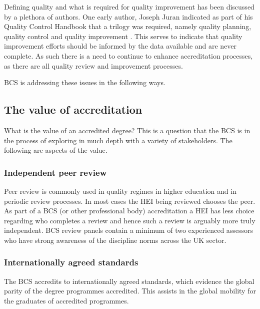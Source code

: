 \documentclass[sigconf]{acmart}
\begin{document}
Defining quality and what is required for quality improvement has been discussed by a plethora of authors. One early author, Joseph Juran indicated as part of his Quality Control Handbook that a trilogy was required, namely quality planning, quality control and quality improvement \cite{juran1962quality}. This serves to indicate that quality improvement efforts should be informed by the data available and are never complete. As such there is a need to continue to enhance accreditation processes, as there are all quality review and improvement processes.

BCS is addressing these issues in the following ways.

\subsection{The value of accreditation}
What is the value of an accredited degree? This is a question that the BCS is in the process of exploring in much depth with a variety of stakeholders. The following are aspects of the value.

\subsubsection{Independent peer review}
Peer review is commonly used in quality regimes in higher education and in periodic review processes. In most cases the HEI being reviewed chooses the peer. As part of a BCS (or other professional body) accreditation a HEI has less choice regarding who completes a review and hence such a review is arguably more truly independent. BCS review panels contain a minimum of two experienced assessors who have strong awareness of the discipline norms across the UK sector.

\subsubsection{Internationally agreed standards}
The BCS accredits to internationally agreed standards, which evidence the global parity of the degree programmes accredited.  This assists in the global mobility for the graduates of accredited programmes.
\end{document}
